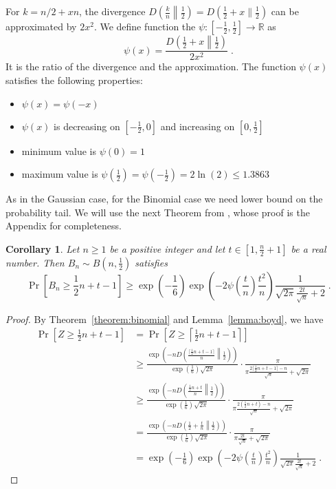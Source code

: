\documentclass{article}
\newcommand{\field}[1]{\mathbb{#1}}
\newcommand{\R}{\field{R}}
\newtheorem{corollary}[theorem]{Corollary}
\begin{document}
For $k=n/2 + xn$, the divergence $D \left( \frac{k}{n} \middle\| \frac{1}{2} \right) = D \left(\frac{1}{2} + x \| \frac{1}{2} \right)$ can be approximated by $2x^2$.
We define function the $\psi:[-\frac{1}{2},\frac{1}{2}] \to \R$ as 
$$
\psi(x) = \frac{D \left(\frac{1}{2}+x \middle\| \frac{1}{2} \right)}{2 x^2} \; .
$$
It is the ratio of the divergence and the approximation. The function $\psi(x)$ satisfies the following properties:
\begin{itemize}
\item $\psi(x) = \psi(-x)$
\item $\psi(x)$ is decreasing on $[-\frac{1}{2}, 0]$ and increasing on $[0, \frac{1}{2}]$
\item minimum value is $\psi(0) = 1$
\item maximum value is $\psi(\frac{1}{2}) = \psi(-\frac{1}{2}) = 2 \ln(2) \le 1.3863$
\end{itemize}

As in the Gaussian case, for the Binomial case we need lower bound on the
probability tail.  We will use the next Theorem from \cite{nOrabona13}, whose
proof is the Appendix for completeness.

\begin{corollary}
\label{corollary:binomial}
Let $n \ge 1$ be a positive integer and let $t \in [1, \frac{n}{2} + 1]$ be a real number. Then $B_n \sim B(n, \frac{1}{2})$ satisfies
$$
\Pr \left[ B_n \ge \frac{1}{2} n + t - 1 \right] \ge \exp\left(-\frac{1}{6}\right) \exp\left(- 2 \psi\left(\frac{t}{n}\right) \frac{t^2}{n} \right) \frac{1}{\sqrt{2\pi} \frac{2 t}{\sqrt{n}} + 2} \; .
$$
\end{corollary}

\begin{proof}
By Theorem~\ref{theorem:binomial} and Lemma~\ref{lemma:boyd}, we have
\begin{align*}
\Pr \left[ Z \ge  \frac{1}{2} n + t - 1 \right]
& = \Pr \left[ Z \ge \left\lceil \frac{1}{2} n + t - 1 \right\rceil \right] \\
& \ge \frac{\exp\left(-n D \left(\frac{\lceil \frac{1}{2}n + t - 1 \rceil}{n} \middle\| \frac{1}{2} \right)\right)}{\exp\left(\frac{1}{6}\right) \sqrt{2 \pi}} \cdot \frac{\pi}{\pi \frac{2\lceil \frac{1}{2}n + t - 1 \rceil - n}{\sqrt{n}} + \sqrt{2 \pi}} \\
& \ge \frac{\exp\left(-n D \left(\frac{\frac{1}{2}n + t}{n} \middle\| \frac{1}{2} \right)\right)}{\exp\left(\frac{1}{6}\right) \sqrt{2 \pi}} \cdot \frac{\pi}{\pi \frac{2 (\frac{1}{2}n + t) - n}{\sqrt{n}} + \sqrt{2 \pi}} \\
& = \frac{\exp\left(-n D \left(\frac{1}{2} + \frac{t}{n} \middle\| \frac{1}{2} \right)\right)}{\exp\left(\frac{1}{6}\right) \sqrt{2 \pi}} \cdot \frac{\pi}{\pi \frac{2t}{\sqrt{n}} + \sqrt{2 \pi}} \\
& = \exp\left(-\frac{1}{6}\right) \exp\left(- 2 \psi\left(\frac{t}{n}\right) \frac{t^2}{n} \right) \frac{1}{\sqrt{2\pi} \frac{2 t}{\sqrt{n}} + 2} \; .
\end{align*}
\end{proof}
\end{document}
